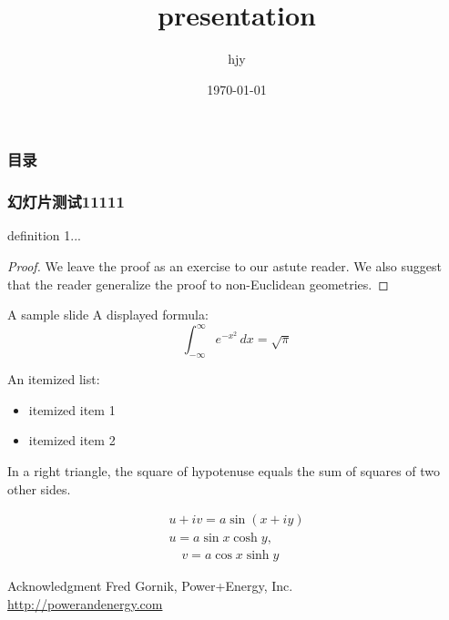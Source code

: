 \documentclass[12pt,a4paper]{beamer}
\author{hjy}
\title{presentation}
\institute{TongJi University}
\date{\today}
\begin{document}
\begin{CJK*}{UTF8}{gkai}
\begin{frame} 				
	\titlepage 
\end{frame}
	
\begin{frame}
	\frametitle{目录}
	\tableofcontents
\end{frame}
  
\begin{frame}
	\frametitle{幻灯片测试11111}
	\setlength{\fboxrule}{4pt} 
	
	\pause
	\begin{definition}
		definition 1...
	\end{definition}
	
	\begin{proof}
  		We leave the proof as an exercise to our astute reader.
  		We also suggest that the reader generalize the proof to
  		non-Euclidean geometries.
	\end{proof}
\end{frame}
    
\begin{frame}[label=sample]{A sample slide}
	A displayed formula:
	\[
		\int_{-\infty}^\infty e^{-x^2} \, dx = \sqrt{\pi}
	\]

	An itemized list:
	\begin{itemize}
  		\item itemized item 1
  		\item itemized item 2
	\end{itemize}

	\begin{theorem}
		In a right triangle, the square of hypotenuse equals
		the sum of squares of two other sides.
	\end{theorem}
	
	\begin{gather}
 		 u + iv = a \sin(x + iy) \\
  		u = a \sin x \cosh y, \\
  	 	\quad v = a \cos x \sinh y
	\end{gather}
\end{frame}

\begin{frame}{Acknowledgment}
Fred Gornik, Power+Energy, Inc.\\
\href{http://powerandenergy.com}{http://powerandenergy.com}


\end{frame}
\end{CJK*}
\end{document}
